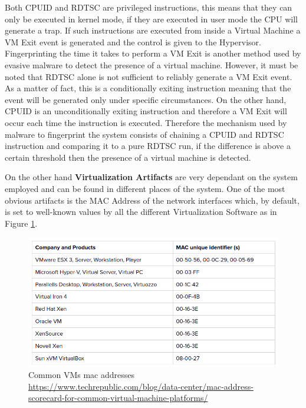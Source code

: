 Both CPUID and RDTSC are privileged instructions, this means that they can only be executed in kernel mode, if they are executed in user mode the CPU will generate a trap. If such instructions are executed from inside a Virtual Machine a VM Exit event is generated and the control is given to the Hypervisor. Fingerprinting the time it takes to perform a VM Exit is another method used by evasive malware to detect the presence of a virtual machine. However, it must be noted that RDTSC alone is not sufficient to reliably generate a VM Exit event. As a matter of fact, this is a conditionally exiting instruction meaning that the event will be generated only under specific circumstances. On the other hand, CPUID is an unconditionally exiting instruction and therefore a VM Exit will occur each time the instruction is executed. Therefore the mechanism used by malware to fingerprint the system consists of chaining a CPUID and RDTSC instruction and comparing it to a pure RDTSC run, if the difference is above a certain threshold then the presence of a virtual machine is detected.

On the other hand \textbf{Virtualization Artifacts} are very dependant on the system employed and can be found in different places of the system. One of the most obvious artifacts is the MAC Address of the network interfaces which, by default, is set to well-known values by all the different Virtualization Software as in Figure \ref{fig:vms}.

\noindent
\begin{figure}[htp]
\centering
\includegraphics[width=\linewidth]{images/vms-mac-address.png}
\caption{Common VMs mac addresses \newline \url{https://www.techrepublic.com/blog/data-center/mac-address-scorecard-for-common-virtual-machine-platforms/}}
\label{fig:vms}
\end{figure}

